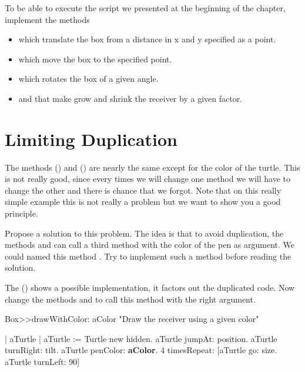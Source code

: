 To be able to execute the script we presented at the beginning of the chapter, implement the methods
\begin{itemize}
\item  {} which translate the box 
from a distance in x and y specified as a point. 
\item {} which move the box to the specified point.
\item {} which rotates the box of a given angle. 
\item {} and  
that make grow and shrink the receiver by a given factor.
\end{itemize}







\section{Limiting Duplication}\label{sec:}
The methods  () and 
() are nearly the same except for the color of the
turtle.  This is not really good, since every times we will change one
method we will have to change the other and there is chance that we
forgot. Note that on this really simple example this is not really a
problem but we want to show you a good principle.

Propose a solution to this problem. The idea is that to avoid
duplication, the methods  and  can call a third
method with the color of the pen as argument. We could named this
method . Try to implement such a method before
reading the solution.

The  () shows a
possible implementation, it factors out the duplicated code. Now
change the methods  and  to call this method with
the right argument.

\begin{method} \label{mt:drawWithColor}
Box>>drawWithColor: aColor 
   "Draw the receiver using a given color"
	
   | aTurtle |
   aTurtle := Turtle new hidden.
   aTurtle jumpAt: position.
   aTurtle turnRight: tilt.
   aTurtle penColor: \textbf{aColor}.
   4 timesRepeat: [aTurtle go: size.
                  aTurtle turnLeft: 90]
\end{method}

